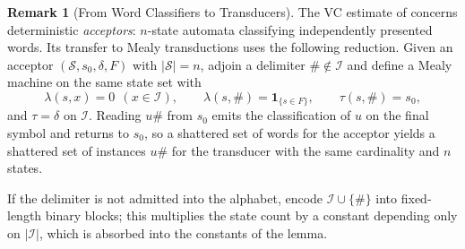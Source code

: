 \documentclass[12pt]{article}
\theoremstyle{definition}
\newtheorem{remark}[theorem]{Remark}
\begin{document}
\begin{remark}[From Word Classifiers to Transducers]
\label{rem:dfa-to-mealy}
The VC estimate of \cite{ishigami1993} concerns deterministic \emph{acceptors}:
$n$-state automata classifying independently presented words.  Its transfer to
Mealy transductions uses the following reduction.  Given an acceptor
$(\mathcal S,s_0,\delta,F)$ with $|\mathcal S|=n$, adjoin a delimiter
$\#\notin\mathcal I$ and define a Mealy machine on the same state set with
\[
\lambda(s,x)=0\ \ (x\in\mathcal I),
\qquad
\lambda(s,\#)=\mathbf 1_{\{s\in F\}},
\qquad
\tau(s,\#)=s_0,
\]
and $\tau=\delta$ on $\mathcal I$.  Reading $u\#$ from $s_0$ emits the
classification of $u$ on the final symbol and returns to $s_0$, so a shattered
set of words for the acceptor yields a shattered set of instances $u\#$ for the
transducer with the same cardinality and $n$ states.

If the delimiter is not admitted into the alphabet, encode $\mathcal I\cup\{\#\}$
into fixed-length binary blocks; this multiplies the state count by a constant
depending only on $|\mathcal I|$, which is absorbed into the constants of the
lemma.
\end{remark}
\end{document}
